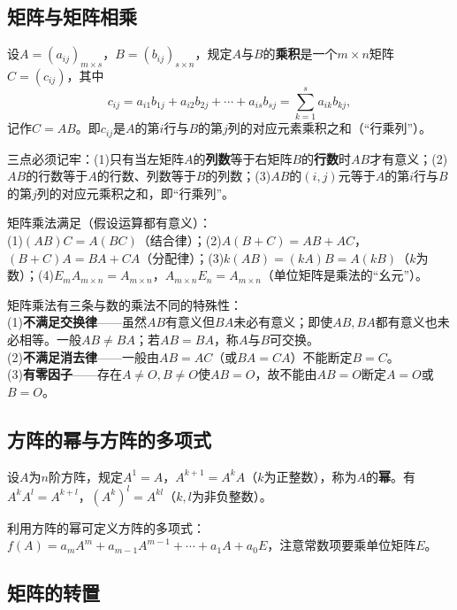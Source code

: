 \subsection{矩阵与矩阵相乘}

\begin{definition}
设$A=(a_{ij})_{m\times s}$，$B=(b_{ij})_{s\times n}$，规定$A$与$B$的\textbf{乘积}是一个$m\times n$矩阵$C=(c_{ij})$，其中
\[
c_{ij}=a_{i1}b_{1j}+a_{i2}b_{2j}+\cdots+a_{is}b_{sj}=\sum_{k=1}^{s}a_{ik}b_{kj},
\]
记作$C=AB$。即$c_{ij}$是$A$的第$i$行与$B$的第$j$列的对应元素乘积之和（“行乘列”）。
\end{definition}

三点必须记牢：(1)只有当左矩阵$A$的\textbf{列数}等于右矩阵$B$的\textbf{行数}时$AB$才有意义；(2)$AB$的行数等于$A$的行数、列数等于$B$的列数；(3)$AB$的$(i,j)$元等于$A$的第$i$行与$B$的第$j$列的对应元乘积之和，即“行乘列”。

矩阵乘法满足（假设运算都有意义）：\\
(1)$(AB)C=A(BC)$（结合律）；(2)$A(B+C)=AB+AC$，$(B+C)A=BA+CA$（分配律）；(3)$k(AB)=(kA)B=A(kB)$（$k$为数）；(4)$E_mA_{m\times n}=A_{m\times n}$，$A_{m\times n}E_n=A_{m\times n}$（单位矩阵是乘法的“幺元”）。

矩阵乘法有三条与数的乘法不同的特殊性：\\
(1)\textbf{不满足交换律}——虽然$AB$有意义但$BA$未必有意义；即使$AB,BA$都有意义也未必相等。一般$AB\neq BA$；若$AB=BA$，称$A$与$B$可交换。\\
(2)\textbf{不满足消去律}——一般由$AB=AC$（或$BA=CA$）不能断定$B=C$。\\
(3)\textbf{有零因子}——存在$A\neq O,B\neq O$使$AB=O$，故不能由$AB=O$断定$A=O$或$B=O$。

\subsection{方阵的幂与方阵的多项式}

设$A$为$n$阶方阵，规定$A^1=A$，$A^{k+1}=A^kA$（$k$为正整数），称为$A$的\textbf{幂}。有$A^kA^l=A^{k+l}$，$(A^k)^l=A^{kl}$（$k,l$为非负整数）。


利用方阵的幂可定义方阵的多项式：$f(A)=a_mA^m+a_{m-1}A^{m-1}+\cdots+a_1A+a_0E$，注意常数项要乘单位矩阵$E$。

\subsection{矩阵的转置}

